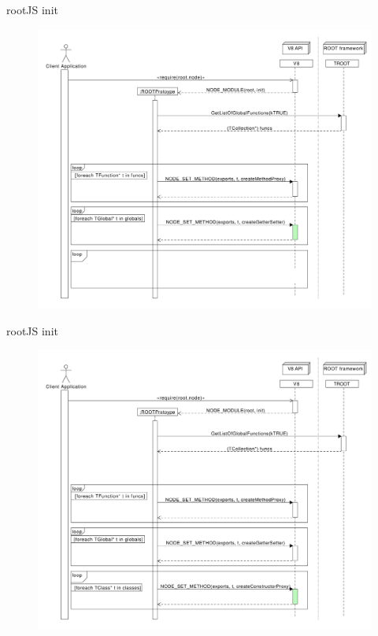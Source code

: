 \begin{frame}{rootJS init}
  \begin{figure}[htb]
    \centering
      \includegraphics[width=\textwidth, height=.85\textheight, keepaspectratio]{./resources/initialize/initialize_h5.pdf}
  \end{figure}
\end{frame}

\begin{frame}{rootJS init}
  \begin{figure}[htb]
    \centering
      \includegraphics[width=\textwidth, height=.85\textheight, keepaspectratio]{./resources/initialize/initialize_h6.pdf}
  \end{figure}
\end{frame}

